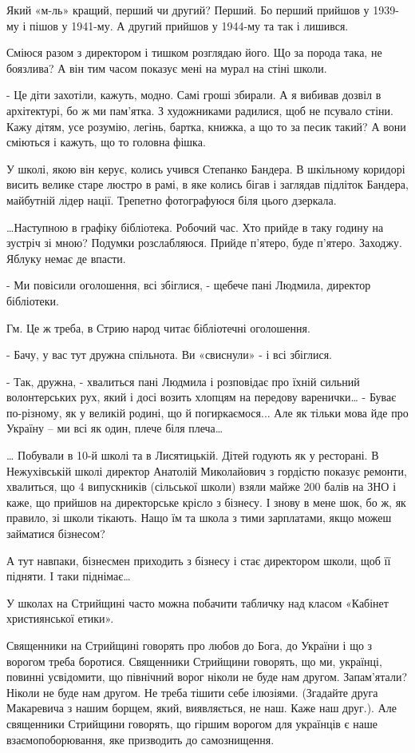 Який «м-ль» кращий, перший чи другий? Перший. Бо перший прийшов у 1939-му і
пішов у 1941-му. А другий прийшов у 1944-му та так і лишився.

Сміюся разом з директором і тишком розглядаю його.  Що за порода така, не
боязлива? А він тим часом показує мені на мурал на стіні школи. 

- Це діти захотіли, кажуть, модно. Самі гроші збирали. А я вибивав дозвіл в
архітектурі, бо ж ми пам’ятка. З художниками радилися, щоб не псувало стіни.
Кажу дітям, усе розумію, легінь, бартка, книжка, а що то за песик такий? А вони
сміються і кажуть, що то головна фішка.  

У школі, якою він керує, колись учився Степанко Бандера. В шкільному коридорі
висить велике старе люстро в рамі, в яке колись бігав і заглядав підліток
Бандера, майбутній лідер нації. Трепетно фотографуюся біля цього дзеркала. 

…Наступною в графіку бібліотека. Робочий час. Хто прийде в таку годину на
зустріч зі мною? Подумки розслабляюся. Прийде п’ятеро, буде п’ятеро. Заходжу.
Яблуку немає де впасти. 

- Ми повісили оголошення, всі збіглися, - щебече пані Людмила, директор бібліотеки.

Гм. Це ж треба, в Стрию народ читає бібліотечні оголошення. 

- Бачу, у вас тут дружна спільнота. Ви «свиснули» - і всі збіглися.

- Так, дружна, - хвалиться пані Людмила і розповідає про їхній сильний
волонтерських рух, який і досі возить хлопцям на передову варенички… - Буває
по-різному, як у великій родині, що й погиркаємося... Але як тільки мова йде
про Україну – ми всі як один, плече біля плеча…

… Побували в 10-й школі та в Лисятицькій. Дітей годують як у ресторані. В
Нежухівській школі директор Анатолій Миколайович з гордістю показує ремонти,
хвалиться, що 4 випускників (сільської школи) взяли майже 200 балів на ЗНО і
каже, що прийшов на директорське крісло з бізнесу. І знову в мене шок, бо ж, як
правило, зі школи тікають. Нащо їм та школа з тими зарплатами, якщо можеш
займатися бізнесом? 

А тут навпаки, бізнесмен приходить з бізнесу і стає директором школи, щоб її підняти. І таки піднімає… 

У школах на Стрийщині часто можна побачити табличку над класом «Кабінет християнської етики». 

Священники на Стрийщині говорять про любов до Бога, до України і що з ворогом
треба боротися. Священники Стрийщини говорять, що ми, українці, повинні
усвідомити, що північний ворог ніколи не буде нам другом. Запам’ятали? Ніколи
не буде нам другом. Не треба тішити себе ілюзіями. (Згадайте друга Макаревича з
нашим борщем, який, виявляється, не наш. Каже наш друг.). Але священники
Стрийщини говорять, що гіршим ворогом для українців є наше взаємопоборювання,
яке призводить до самознищення.

